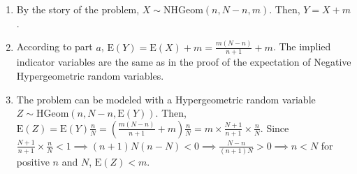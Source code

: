 \begin{enumerate}[label=(\alph*)]
\item By the story of the problem, $X \sim \text{NHGeom}(n, N-n, m)$. Then, $Y =
X + m$.

\item According to part $a$, $\text{E}(Y) = \text{E}(X) + m = \frac{m(N-n)}
{n+1} + m$. The implied indicator variables are the same as in the proof of the
expectation of Negative Hypergeometric random variables.

\item The problem can be modeled with a Hypergeometric random variable $Z
\sim \text{HGeom}(n, N-n, \text{E}(Y))$. Then, $\text{E}(Z) = \text{E}
(Y)\frac{n}{N} = (\frac{m(N-n)}{n+1} + m)\frac{n}{N} = m \times \frac{N+1}
{n+1}\times
\frac{n}{N}$. Since $\frac{N+1}{n+1} \times \frac{n}{N} < 1 \implies (n+1)N(n-N)
< 0 \implies \frac{N-n}{(n+1)N} > 0 \implies n < N$ for positive $n$ and $N$, $
\text{E}(Z) < m$.
\end{enumerate}